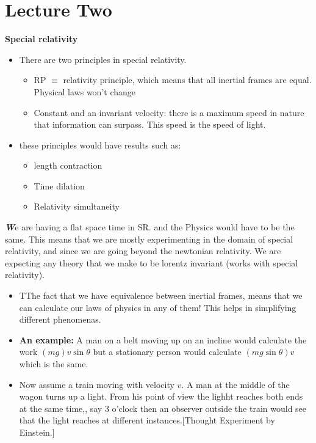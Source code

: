 \documentclass[10pt,a4paper,twocolumn]{article}
\newcounter{theo}
\newenvironment{callout}
	{\begin{calloutbox}\color{charcoal}\textbf\textit}
	{\end{calloutbox}}
\begin{document}
    \section{Lecture Two}
        \textbf{Special relativity}
        \begin{itemize}
            \item There are two principles in special relativity.
            \begin{itemize}
                \item RP $\equiv$ relativity principle, which means that all inertial frames are equal. Physical laws won't change
                \item Constant and an invariant velocity: there is a maximum speed in nature that information can surpass. This speed is the speed of light.
            \end{itemize}  
            \item these principles would have results such as: 
            \begin{itemize}
                \item length contraction
                \item Time dilation
                \item Relativity simultaneity
            \end{itemize}
        \end{itemize}
        \begin{callout}
            We are having a flat space time in SR. and the Physics would have to be the same. This means that we are mostly experimenting in the domain of special relativity, and since we are going beyond the newtonian relativity. We are expecting any theory that we make to be lorentz invariant (works with special relativity).
        \end{callout}
        \begin{itemize}
            \item TThe fact that we have equivalence between inertial frames, means that we can calculate our laws of physics in any of them! This helps in simplifying different phenomenas.
            \item \textbf{An example:} A man on a belt moving up on an incline would calculate the work $(mg)v\sin\theta$ but a stationary person would calculate $(mg\sin\theta)v$ which is the same.
            \item Now assume a train moving with velocity $v$. A man at the middle of the wagon turns up a light. From his point of view the lighht reaches both ends at the same time,, say $3$ o'clock then an observer outside the train would see that the light reaches at different instances.[Thought Experiment by Einstein.]
        \end{itemize}
\end{document}
